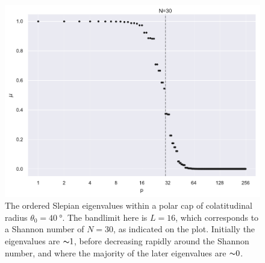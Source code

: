 \begin{figure}[htpb]
	\centering\capstart{}
	\includegraphics[width=\textwidth]{polar_cap_eigenvalues.pdf}
	\caption[
		The Slepian eigenvalues within a \(\SI{40}{\degree}\) polar cap
	]{
		The ordered Slepian eigenvalues within a polar cap of colatitudinal radius \(\theta_{0}=\SI{40}{\degree}\).
		The bandlimit here is  \(L=16\), which corresponds to a Shannon number of \(N=30\), as indicated on the plot.
		Initially the eigenvalues are \({\thicksim}1\), before decreasing rapidly around the Shannon number, and where the majority of the later eigenvalues are \({\thicksim}0\).
	}\label{fig:chapter2_polar_cap_eigenvalues}
\end{figure}
